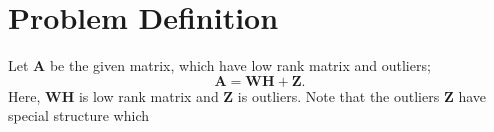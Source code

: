 \section{Problem Definition}
\label{sec:probdefn}

Let $\mathbf{A}$ be the given matrix, which have low rank matrix and outliers;
\begin{equation}
\mathbf{A} = \mathbf{W}\mathbf{H} + \mathbf{Z}.
\end{equation}
Here, $\mathbf{W}\mathbf{H}$ is low rank matrix and $\mathbf{Z}$ is outliers. Note that the outliers $\mathbf{Z}$ have special structure which 
